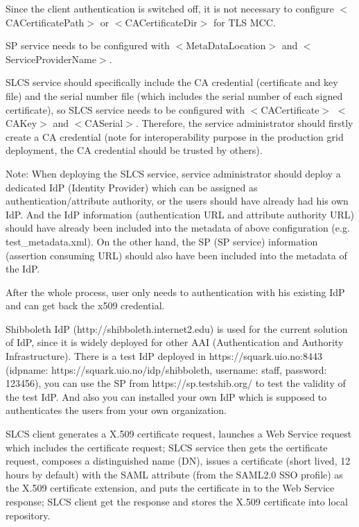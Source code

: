 \documentclass{article}                            %
\begin{document}
    Since the client authentication is switched off, it is not necessary to configure $<$CACertificatePath$>$ or $<$CACertificateDir$>$ for TLS MCC.

    SP service needs to be configured with $<$MetaDataLocation$>$ and $<$ServiceProviderName$>$.

    SLCS service should specifically include the CA credential (certificate and key file) and the serial number file (which includes the serial number of each signed certificate), so SLCS service needs to be configured with $<$CACertificate$>$ $<$CAKey$>$ and $<$CASerial$>$. Therefore, the service administrator should firstly create a CA credential (note for interoperability purpose in the production grid deployment, the CA credential should be trusted by others).

Note: When deploying the SLCS service, service administrator should deploy a dedicated IdP (Identity Provider) which can be assigned as authentication/attribute authority, or the users should have already had his own IdP. And the IdP information (authentication URL and attribute authority URL) should have already been included into the metadata of above configuration (e.g. test\_metadata.xml). On the other hand, the SP (SP service) information (assertion consuming URL) should also have been included into the metadata of the IdP.

    After the whole process, user only needs to authentication with his existing IdP and can get back the x509 credential.

    Shibboleth IdP (http://shibboleth.internet2.edu) is used for the current solution of IdP, since it is widely deployed for other AAI (Authentication and Authority Infrastructure). There is a test IdP deployed in https://squark.uio.no:8443 (idpname: https://squark.uio.no/idp/shibboleth, username: staff, password: 123456), you can use the SP from https://sp.testshib.org/ to test the validity of the test IdP. And also you can installed your own IdP which is supposed to authenticates the users from your own organization.

    SLCS client generates  a X.509 certificate  request, launches a Web Service request which includes the certificate request; SLCS service then gets the certificate request, composes a distinguished name (DN), issues a certificate (short lived, 12 hours by default) with the SAML attribute (from the SAML2.0 SSO profile) as the X.509 certificate extension, and puts the certificate in to the Web Service response; SLCS client get the response and stores the X.509 certificate into local repository.
\end{document}
